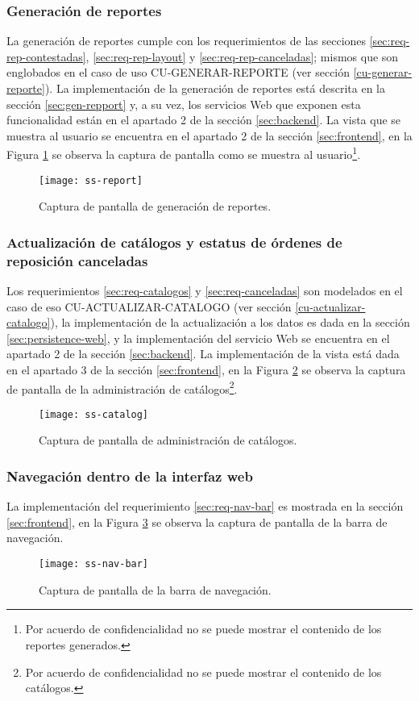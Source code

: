 \subsubsection{Generación de reportes}
La generación de reportes cumple con los requerimientos de las secciones \ref{sec:req-rep-contestadas}, \ref{sec:req-rep-layout} y \ref{sec:req-rep-canceladas}; mismos que son englobados en el caso de uso CU-GENERAR-REPORTE (ver sección \ref{cu-generar-reporte}). La implementación de la generación de reportes está descrita en la sección \ref{sec:gen-repport} y, a su vez, los servicios Web que exponen esta funcionalidad están en el apartado 2 de la sección \ref{sec:backend}. La vista que se muestra al usuario se encuentra en el apartado 2 de la sección \ref{sec:frontend}, en la Figura \ref{fig:ss-report} se observa la captura de pantalla como se muestra al usuario\footnote{Por acuerdo de confidencialidad no se puede mostrar el contenido de los reportes generados.}. 
	\begin{figure}[h]
		\centering
		\texttt{[image: ss-report]}
		\caption{Captura de pantalla de generación de reportes.}
		\label{fig:ss-report}
	\end{figure}

\subsubsection{Actualización de catálogos y estatus de órdenes de reposición canceladas}
Los requerimientos \ref{sec:req-catalogos} y \ref{sec:req-canceladas} son modelados en el caso de eso CU-ACTUALIZAR-CATALOGO (ver sección \ref{cu-actualizar-catalogo}), la implementación de la actualización a los datos es dada en la sección \ref{sec:persistence-web}, y la implementación del servicio Web se encuentra en el apartado 2 de la sección \ref{sec:backend}. La implementación de la vista está dada en el apartado 3 de la sección \ref{sec:frontend}, en la Figura \ref{fig:ss-catalog} se observa la captura de pantalla de la administración de catálogos\footnote{Por acuerdo de confidencialidad no se puede mostrar el contenido de los catálogos.}.
\begin{figure}[h]
	\centering
	\texttt{[image: ss-catalog]}
	\caption{Captura de pantalla de administración de catálogos.}
	\label{fig:ss-catalog}
\end{figure}

\subsubsection{Navegación dentro de la interfaz web}
La implementación del requerimiento \ref{sec:req-nav-bar} es mostrada en la sección \ref{sec:frontend}, en la Figura \ref{fig:ss-nav-bar} se observa la captura de pantalla de la barra de navegación.
\begin{figure}[h]
	\centering
	\texttt{[image: ss-nav-bar]}
	\caption{Captura de pantalla de la barra de navegación.}
	\label{fig:ss-nav-bar}
\end{figure}


